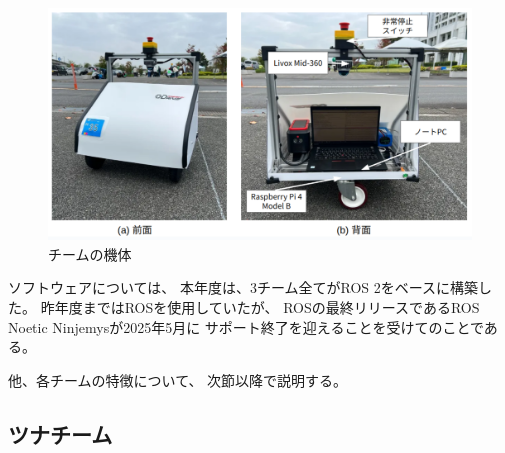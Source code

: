 \documentclass[twocolumn,9pt]{jsproceedings}
\begin{document}

\begin{figure}[h]
  \begin{center}
    \includegraphics[width=1.0\linewidth]{figs/0_robot.pdf}
    \caption{チームの機体}
    \label{fig:robot}
  \end{center}
\end{figure}

ソフトウェアについては、
本年度は、3チーム全てがROS 2をベースに構築した。
昨年度まではROS\cite{ROS}を使用していたが、
ROSの最終リリースであるROS Noetic Ninjemysが2025年5月に
サポート終了を迎えることを受けてのことである。

他、各チームの特徴について、
次節以降で説明する。


\subsection{ツナチーム}
\end{document}
